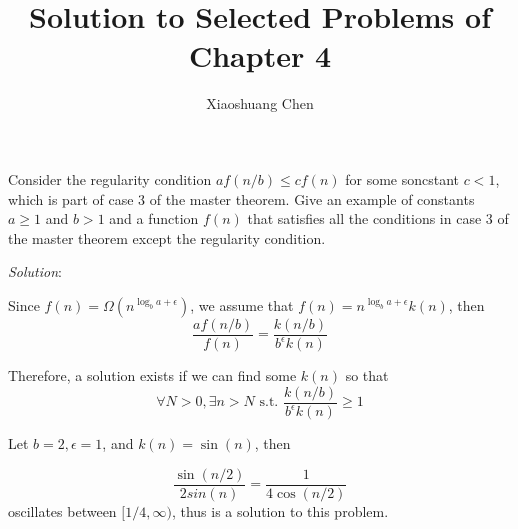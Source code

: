 \documentclass[12pt]{article}
\newenvironment{problem}[2][Problem]{\begin{trivlist}
\item[\hskip \labelsep {\bfseries #1}\hskip \labelsep {\bfseries #2.}]}{\end{trivlist}}
\begin{document}
 
 
\title{Solution to Selected Problems of Chapter 4}
\author{Xiaoshuang Chen}
\maketitle
 
\begin{problem}{4.5-5}
    Consider the regularity condition $af(n/b)\leq cf(n)$ for some soncstant $c<1$, which is part of case 3 of the master theorem. Give an example of constants $a\geq1$ and $b>1$ and a function $f(n)$ that satisfies all the conditions in case 3 of the master theorem except the regularity condition.
\end{problem}

\noindent\textit{Solution}:

Since $f(n)=\Omega(n^{\log_ba+\epsilon})$, we assume that $f(n)=n^{\log_ba+\epsilon}k(n)$, then
\begin{equation*}
    \frac{af(n/b)}{f(n)} = \frac{k(n/b)}{b^\epsilon k(n)}
\end{equation*}

Therefore, a solution exists if we can find some $k(n)$ so that
\begin{equation*}
    \forall N>0,\exists n>N \text{ s.t. } \frac{k(n/b)}{b^\epsilon k(n)} \geq 1
\end{equation*}

Let $b=2,\epsilon = 1$, and $k(n) = \sin(n)$, then

\begin{equation*}
    \frac{\sin(n / 2)}{2sin(n)} = \frac{1}{4\cos(n/2)}
\end{equation*}
oscillates between $[1/4, \infty)$, thus is a solution to this problem.
\end{document}
